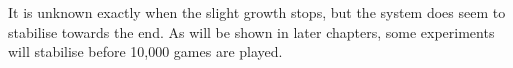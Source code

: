 It is unknown exactly when the slight growth stops, but the system does seem to stabilise towards the end. As will be shown in later chapters, some experiments will stabilise before 10,000 games are played.

\enlargethispage{4\baselineskip}
\begin{figure}[H]
\centering
{}
\\
\end{figure}
